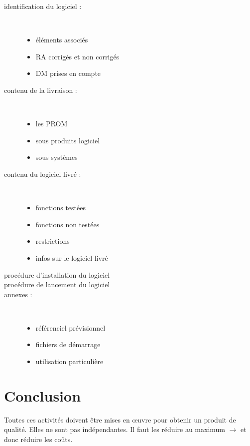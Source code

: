 \begin{description}
	\item[identification du logiciel :]\hfill\\
	\begin{itemize}
		\item éléments associés
		\item RA corrigés et non corrigés
		\item DM prises en compte
	\end{itemize}

	\item[contenu de la livraison :]\hfill\\
	\begin{itemize}
		\item les PROM
		\item sous produits logiciel
		\item sous systèmes
	\end{itemize}

	\item[contenu du logiciel livré :]\hfill\\
	\begin{itemize}
		\item fonctions testées
		\item fonctions non testées
		\item restrictions
		\item infos sur le logiciel livré
	\end{itemize}

	\item[procédure d’installation du logiciel]

	\item[procédure de lancement du logiciel]

	\item[annexes :]\hfill\\
	\begin{itemize}
		\item référenciel prévisionnel
		\item fichiers de démarrage
		\item utilisation particulière
	\end{itemize}
\end{description}

\section{Conclusion}

Toutes ces activités doivent être mises en \oe{}uvre pour obtenir un produit de qualité. Elles ne sont pas indépendantes. Il faut les réduire au maximum $\rightarrow$ et donc réduire les coûts.

